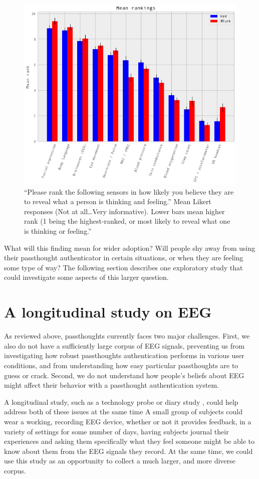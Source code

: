 \documentclass[sigconf]{acmart}
\begin{document}
\label{fig:rank}
\begin{figure}
\centering
\includegraphics[width=.9\linewidth]{./figures/rankings.png}
\caption{``Please rank the following sensors in how likely you believe they are to reveal what a person is thinking and feeling.'' Mean Likert responses (Not at all\ldots{}Very informative). Lower bars mean higher rank (1 being the highest-ranked,  or most likely to reveal what one is thinking or feeling.''}
\end{figure}

What will this finding mean for wider adoption? 
Will people shy away from using their passthought authenticator in certain situations, or when they are feeling some type of way?
The following section describes one exploratory study that could investigate some aspects of this larger question.

\section{A longitudinal study on EEG}
\label{sec:orge9574b2}

As reviewed above, passthoughts currently faces two major challenges.
First, we also do not have a sufficiently large corpus of EEG signals, 
preventing us from investigating how robust passthoughts authentication performs in various user conditions,
and from understanding how easy particular passthoughts are to guess or crack.
Second, we do not understand how people's beliefs about EEG might affect their behavior with a passthought authentication system.

A longitudinal study, such as a technology probe or diary study \cite{Gaver1999}, could help address both of these issues at the same time 
A small group of subjects could wear a working, recording EEG device, whether or not it provides feedback, in a variety of settings for some number of days,
having subjects journal their experiences and asking them specifically what they feel someone might be able to know about them from the EEG signals they record.
At the same time, we could use this study as an opportunity to collect a much larger, and more diverse corpus.
\end{document}
